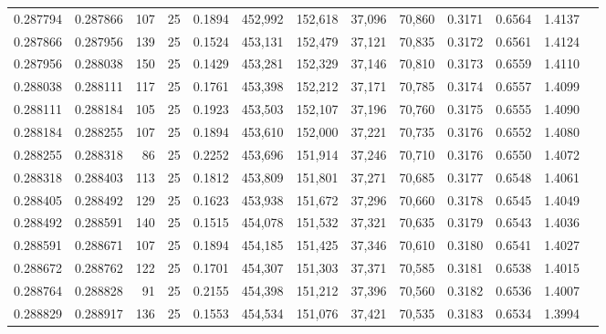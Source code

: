 \begin{tabular}{rrrrrrrrrrrrr}
0.287794 & 0.287866 &   107 &  25 &                                     0.1894 & 452,992 & 152,618 &  37,096 &  70,860 & 0.3171 & 0.6564 & 1.4137 \\
0.287866 & 0.287956 &   139 &  25 &                                     0.1524 & 453,131 & 152,479 &  37,121 &  70,835 & 0.3172 & 0.6561 & 1.4124 \\
0.287956 & 0.288038 &   150 &  25 &                                     0.1429 & 453,281 & 152,329 &  37,146 &  70,810 & 0.3173 & 0.6559 & 1.4110 \\
0.288038 & 0.288111 &   117 &  25 &                                     0.1761 & 453,398 & 152,212 &  37,171 &  70,785 & 0.3174 & 0.6557 & 1.4099 \\
0.288111 & 0.288184 &   105 &  25 &                                     0.1923 & 453,503 & 152,107 &  37,196 &  70,760 & 0.3175 & 0.6555 & 1.4090 \\
0.288184 & 0.288255 &   107 &  25 &                                     0.1894 & 453,610 & 152,000 &  37,221 &  70,735 & 0.3176 & 0.6552 & 1.4080 \\
0.288255 & 0.288318 &    86 &  25 &                                     0.2252 & 453,696 & 151,914 &  37,246 &  70,710 & 0.3176 & 0.6550 & 1.4072 \\
0.288318 & 0.288403 &   113 &  25 &                                     0.1812 & 453,809 & 151,801 &  37,271 &  70,685 & 0.3177 & 0.6548 & 1.4061 \\
0.288405 & 0.288492 &   129 &  25 &                                     0.1623 & 453,938 & 151,672 &  37,296 &  70,660 & 0.3178 & 0.6545 & 1.4049 \\
0.288492 & 0.288591 &   140 &  25 &                                     0.1515 & 454,078 & 151,532 &  37,321 &  70,635 & 0.3179 & 0.6543 & 1.4036 \\
0.288591 & 0.288671 &   107 &  25 &                                     0.1894 & 454,185 & 151,425 &  37,346 &  70,610 & 0.3180 & 0.6541 & 1.4027 \\
0.288672 & 0.288762 &   122 &  25 &                                     0.1701 & 454,307 & 151,303 &  37,371 &  70,585 & 0.3181 & 0.6538 & 1.4015 \\
0.288764 & 0.288828 &    91 &  25 &                                     0.2155 & 454,398 & 151,212 &  37,396 &  70,560 & 0.3182 & 0.6536 & 1.4007 \\
0.288829 & 0.288917 &   136 &  25 &                                     0.1553 & 454,534 & 151,076 &  37,421 &  70,535 & 0.3183 & 0.6534 & 1.3994 \\

\end{tabular}
